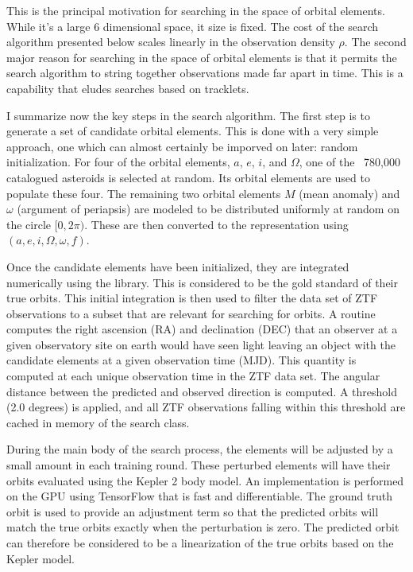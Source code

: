 This is the principal motivation for searching in the space of orbital elements.
While it's a large 6 dimensional space, it size is fixed.
The cost of the search algorithm presented below scales linearly in the observation density $\rho$.
The second major reason for searching in the space of orbital elements is that it permits the search algorithm
to string together observations made far apart in time.
This is a capability that eludes searches based on tracklets.

I summarize now the key steps in the search algorithm.
The first step is to generate a set of candidate orbital elements.
This is done with a very simple approach, one which can almost certainly be imporved on later: random initialization.
For four of the orbital elements, $a$, $e$, $i$, and $\Omega$, one of the ~780,000 catalogued asteroids is selected at random.
Its orbital elements are used to populate these four.
The remaining two orbital elements $M$ (mean anomaly) and $\omega$ (argument of periapsis) are modeled to be distributed
uniformly at random on the circle $[0, 2 \pi)$.
These are then converted to the representation using $(a, e, i, \Omega, \omega, f)$.

Once the candidate elements have been initialized, they are integrated numerically using the  library.
This is considered to be the gold standard of their true orbits.
This initial integration is then used to filter the data set of ZTF observations to a subset that are relevant for searching for orbits.
A routine computes the right ascension (RA) and declination (DEC) that an observer at a given observatory site on earth
would have seen light leaving an object with the candidate elements at a given observation time (MJD).
This quantity is computed at each unique observation time in the ZTF data set.
The angular distance between the predicted and observed direction is computed.
A threshold (2.0 degrees) is applied, and all ZTF observations falling within this threshold are cached in memory of the search class.

During the main body of the search process, the elements will be adjusted by a small amount in each training round.
These perturbed elements will have their orbits evaluated using the Kepler 2 body model.
An implementation is performed on the GPU using TensorFlow that is fast and differentiable.
The ground truth orbit is used to provide an adjustment term so that the predicted orbits will match the true orbits exactly
when the perturbation is zero.
The predicted orbit can therefore be considered to be a linearization of the true orbits based on the Kepler model.

